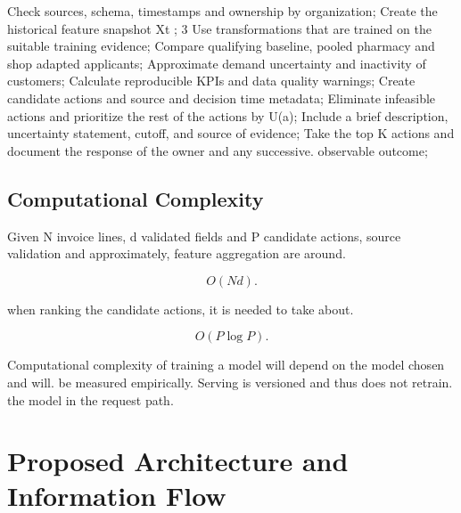 \documentclass[a4paper,11pt,oneside]{book}
\theoremstyle{plain}
\theoremstyle{definition}
\theoremstyle{remark}
\begin{document}
\begin{algorithm}[H]
\caption{B SMART Strategy Recommendation}
\label{alg:bsmart}
Check sources, schema, timestamps and ownership by organization;\;
Create the historical feature snapshot Xt ; 3 Use transformations that are trained on the suitable training evidence;\;
Compare qualifying baseline, pooled pharmacy and shop adapted applicants;\;
Approximate demand uncertainty and inactivity of customers;\;
Calculate reproducible KPIs and data quality warnings;\;
Create candidate actions and source and decision time metadata;\;
Eliminate infeasible actions and prioritize the rest of the actions by U(a);\;
Include a brief description, uncertainty statement, cutoff, and source of evidence;\;
Take the top K actions and document the response of the owner and any successive. observable outcome;\;
\end{algorithm}

\subsection{Computational Complexity}

Given N invoice lines, d validated fields and P candidate actions, source validation and approximately, feature aggregation are around.

\begin{equation}
O(Nd).
\label{eq:validation_complexity}
\end{equation}

when ranking the candidate actions, it is needed to take about.

\begin{equation}
O(P\log P).
\label{eq:ranking_complexity}
\end{equation}

Computational complexity of training a model will depend on the model chosen and will. be measured empirically. Serving is versioned and thus does not retrain. the model in the request path.

\section{Proposed Architecture and Information Flow}
\label{sec:architecture_flow}
\end{document}
